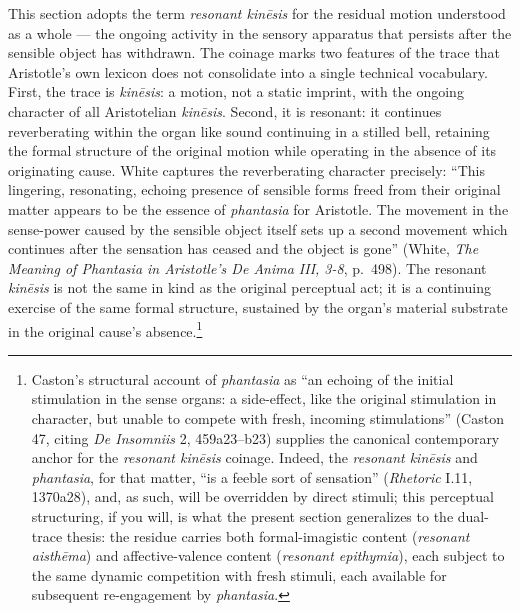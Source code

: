 \documentclass{article}
\begin{document}
This section adopts the term \textit{resonant kinēsis} for the residual motion understood as a whole --- the ongoing activity in the sensory apparatus that persists after the sensible object has withdrawn. The coinage marks two features of the trace that Aristotle's own lexicon does not consolidate into a single technical vocabulary. First, the trace is \textit{kinēsis}: a motion, not a static imprint, with the ongoing character of all Aristotelian \textit{kinēsis}. Second, it is resonant: it continues reverberating within the organ like sound continuing in a stilled bell, retaining the formal structure of the original motion while operating in the absence of its originating cause. White captures the reverberating character precisely: ``This lingering, resonating, echoing presence of sensible forms freed from their original matter appears to be the essence of \textit{phantasia} for Aristotle. The movement in the sense-power caused by the sensible object itself sets up a second movement which continues after the sensation has ceased and the object is gone'' (White, \textit{The Meaning of Phantasia in Aristotle's De Anima III, 3-8}, p.~498). The resonant \textit{kinēsis} is not the same in kind as the original perceptual act; it is a continuing exercise of the same formal structure, sustained by the organ's material substrate in the original cause's absence.\footnote{Caston's structural account of \textit{phantasia} as ``an echoing of the initial stimulation in the sense organs: a side-effect, like the original stimulation in character, but unable to compete with fresh, incoming stimulations'' (Caston 47, citing \textit{De Insomniis} 2, 459a23--b23) supplies the canonical contemporary anchor for the \textit{resonant kinēsis} coinage. Indeed, the \textit{resonant kinēsis} and \textit{phantasia}, for that matter, ``is a feeble sort of sensation'' (\textit{Rhetoric} I.11, 1370a28), and, as such, will be overridden by direct stimuli; this perceptual structuring, if you will, is what the present section generalizes to the dual-trace thesis: the residue carries both formal-imagistic content (\textit{resonant aisthēma}) and affective-valence content (\textit{resonant epithymia}), each subject to the same dynamic competition with fresh stimuli, each available for subsequent re-engagement by \textit{phantasia}.}
\end{document}
